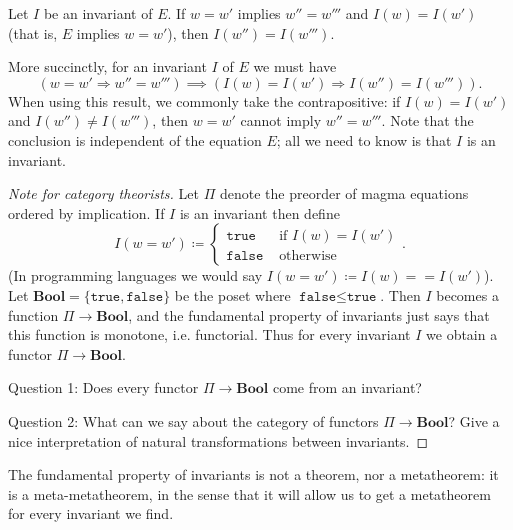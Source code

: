 \begin{metametatheorem}
	Let $I$ be an invariant of $E$. If $w = w'$ implies $w'' = w'''$ and $I(w) = I(w')$ (that is, $E$ implies $w = w'$), then $I(w'') = I(w''')$.
\end{metametatheorem}

More succinctly, for an invariant $I$ of $E$ we must have
\[
(w = w' \Rightarrow w'' = w''') \implies (I(w) = I(w') \Rightarrow I(w'') = I(w''')).
\]
When using this result, we commonly take the contrapositive: if $I(w) = I(w')$ and $I(w'') \neq I(w''')$, then $w=w'$ cannot imply $w'' = w'''$. Note that the conclusion is independent of the equation $E$; all we need to know is that $I$ is an invariant.


\begin{proof}[Note for category theorists]\leanok
	Let $\Pi$ denote the preorder of magma equations ordered by implication. If $I$ is an invariant then define
	\[
	I(w = w')\coloneqq \begin{cases}
		\texttt{true} & \text{ if }I(w) = I(w')\\
		\texttt{false} & \text{ otherwise}
	\end{cases}.
	\]
	(In programming languages we would say $I(w = w') \coloneqq I(w) == I(w')$). Let $\textbf{Bool} = \{ \texttt{true}, \texttt{false}\}$ be the poset where $\texttt{false} \leq \texttt{true}$. Then $I$ becomes a function $\Pi \to \textbf{Bool}$, and the fundamental property of invariants just says that this function is monotone, i.e. functorial. Thus for every invariant $I$ we obtain a functor $\Pi \to \textbf{Bool}$.

	Question 1: Does every functor $\Pi \to \textbf{Bool}$ come from an invariant?

	Question 2: What can we say about the category of functors $\Pi \to \textbf{Bool}$? Give a nice interpretation of natural transformations between invariants.
\end{proof}

The fundamental property of invariants is not a theorem, nor a metatheorem: it is a meta-metatheorem, in the sense that it will allow us to get a metatheorem for every invariant we find.

